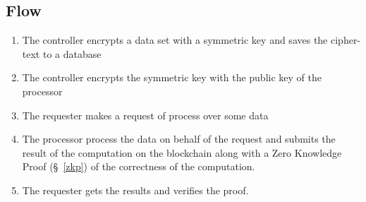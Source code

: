 \subsection{Flow}

\begin{enumerate}
  \item The controller encrypts a data set with a symmetric key and saves the cipher-text to a database
  \item The controller encrypts the symmetric key with the public key of the processor
  \item The requester makes a request of process over some data
  \item The processor process the data on behalf of the request and submits the result of the computation on the
  blockchain along with a Zero Knowledge Proof (§~\ref{zkp}) of the correctness of the computation.
  \item The requester gets the results and verifies the proof.
\end{enumerate}

